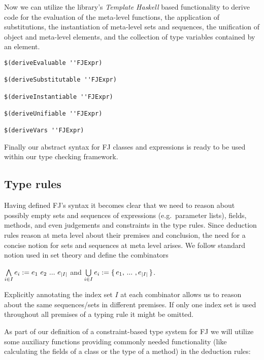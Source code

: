 Now we can utilize the library's \textit{Template Haskell} based
functionality to derive code for the evaluation of the meta-level
functions, the application of substitutions, the instantiation of
meta-level sets and sequences, the unification of object and
meta-level elements, and the collection of type variables contained by
an element.

\smallskip
\begin{lstlisting}
$(deriveEvaluable ''FJExpr)

$(deriveSubstitutable ''FJExpr)

$(deriveInstantiable ''FJExpr)

$(deriveUnifiable ''FJExpr)

$(deriveVars ''FJExpr)
\end{lstlisting}

\smallskip
Finally our abstract syntax for \textsc{FJ} classes and expressions is
ready to be used within our type checking framework.


\subsection{Type rules}

Having defined \textsc{FJ}'s syntax it becomes clear that we need to
reason about possibly empty sets and sequences of expressions
(e.g.~parameter lists), fields, methods, and even judgements and
constraints in the type rules.  Since deduction rules reason at meta
level about their premises and conclusion, the need for a concise
notion for sets and sequences at meta level arises. We follow standard
notion used in set theory and define the combinators

\begin{center}
  $\metaSeq{i \in I}{e_i} := e_1\ e_2\ ...\ e_{|I|}$ \quad and \quad
  $\underset{i \in I}{\bigcup}\, {e_i} := \{\, e_1,\, ...\ , e_{|I|}\, \}$.
\end{center}

Explicitly annotating the index set $I$ at each combinator allows us
to reason about the same sequences/sets in different premises. If only
one index set is used throughout all premises of a typing rule it
might be omitted.

\bigskip

As part of our definition of a constraint-based type system for
\textsc{FJ} we will utilize some auxiliary functions providing
commonly needed functionality (like calculating the fields of a class
or the type of a method) in the deduction rules:


